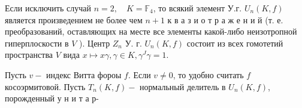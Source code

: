 \documentclass[10pt]{article}
\begin{document}
Если исключить случай $n=2, \quad K=\mathbb{F}_{4}$, то всякий элемент У.г. $U_{n}(K, f)$ является произведением не более чем $n+1$ к в а з и о т р а ж е н и й (т. е. преобразований, оставляющих на месте все элементы какой-либо неизотропной гиперплоскости в $V$ ). Центр $Z_{n}$ У. г. $U_{n}(K, f)$ состоит из всех гомотетий пространства $V$ вида $x \mapsto x \gamma, \gamma \in K, \gamma^{J} \gamma=1$.



Пусть $v-$ индекс Витта фороы $f$. Если $v \neq 0$, то удобно считать $f$ косоэрмитовой. Пусть $T_{n}(K, f)-$ нормальный делитель в $U_{n}(K, f)$, порожденный у н и т а р-
\end{document}
